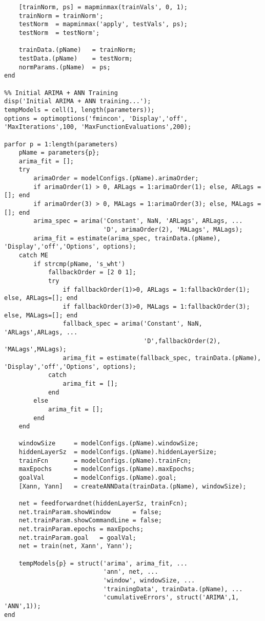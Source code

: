 \begin{verbatim}
    [trainNorm, ps] = mapminmax(trainVals', 0, 1);
    trainNorm = trainNorm';
    testNorm  = mapminmax('apply', testVals', ps);
    testNorm  = testNorm';

    trainData.(pName)   = trainNorm;
    testData.(pName)    = testNorm;
    normParams.(pName)  = ps;
end

%% Initial ARIMA + ANN Training
disp('Initial ARIMA + ANN training...');
tempModels = cell(1, length(parameters));
options = optimoptions('fmincon', 'Display','off', 'MaxIterations',100, 'MaxFunctionEvaluations',200);

parfor p = 1:length(parameters)
    pName = parameters{p};
    arima_fit = [];
    try
        arimaOrder = modelConfigs.(pName).arimaOrder;
        if arimaOrder(1) > 0, ARLags = 1:arimaOrder(1); else, ARLags = []; end
        if arimaOrder(3) > 0, MALags = 1:arimaOrder(3); else, MALags = []; end
        arima_spec = arima('Constant', NaN, 'ARLags', ARLags, ...
                           'D', arimaOrder(2), 'MALags', MALags);
        arima_fit = estimate(arima_spec, trainData.(pName), 'Display','off','Options', options);
    catch ME
        if strcmp(pName, 's_wht')
            fallbackOrder = [2 0 1];
            try
                if fallbackOrder(1)>0, ARLags = 1:fallbackOrder(1); else, ARLags=[]; end
                if fallbackOrder(3)>0, MALags = 1:fallbackOrder(3); else, MALags=[]; end
                fallback_spec = arima('Constant', NaN, 'ARLags',ARLags, ...
                                      'D',fallbackOrder(2), 'MALags',MALags);
                arima_fit = estimate(fallback_spec, trainData.(pName), 'Display','off','Options', options);
            catch
                arima_fit = [];
            end
        else
            arima_fit = [];
        end
    end

    windowSize     = modelConfigs.(pName).windowSize;
    hiddenLayerSz  = modelConfigs.(pName).hiddenLayerSize;
    trainFcn       = modelConfigs.(pName).trainFcn;
    maxEpochs      = modelConfigs.(pName).maxEpochs;
    goalVal        = modelConfigs.(pName).goal;
    [Xann, Yann]   = createANNData(trainData.(pName), windowSize);

    net = feedforwardnet(hiddenLayerSz, trainFcn);
    net.trainParam.showWindow      = false;
    net.trainParam.showCommandLine = false;
    net.trainParam.epochs = maxEpochs;
    net.trainParam.goal   = goalVal;
    net = train(net, Xann', Yann');

    tempModels{p} = struct('arima', arima_fit, ...
                           'ann', net, ...
                           'window', windowSize, ...
                           'trainingData', trainData.(pName), ...
                           'cumulativeErrors', struct('ARIMA',1, 'ANN',1));
end


\end{verbatim}
